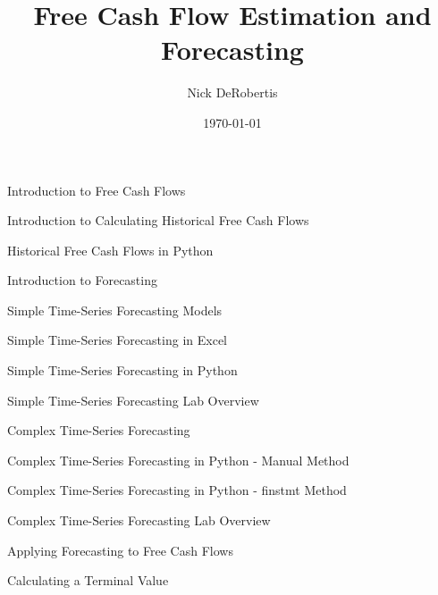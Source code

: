 \documentclass[]{article}
\begin{document}
\title{Free Cash Flow Estimation and Forecasting}
\author{Nick DeRobertis}
\date{\today}
\maketitle
\begin{section}{Introduction to Free Cash Flows}

\end{section}
\begin{section}{Introduction to Calculating Historical Free Cash Flows}

\end{section}
\begin{section}{Historical Free Cash Flows in Python}

\end{section}
\begin{section}{Introduction to Forecasting}

\end{section}
\begin{section}{Simple Time-Series Forecasting Models}

\end{section}
\begin{section}{Simple Time-Series Forecasting in Excel}

\end{section}
\begin{section}{Simple Time-Series Forecasting in Python}

\end{section}
\begin{section}{Simple Time-Series Forecasting Lab Overview}

\end{section}
\begin{section}{Complex Time-Series Forecasting}

\end{section}
\begin{section}{Complex Time-Series Forecasting in Python - Manual Method}

\end{section}
\begin{section}{Complex Time-Series Forecasting in Python - finstmt Method}

\end{section}
\begin{section}{Complex Time-Series Forecasting Lab Overview}

\end{section}
\begin{section}{Applying Forecasting to Free Cash Flows}

\end{section}
\begin{section}{Calculating a Terminal Value}

\end{section}
\end{document}
